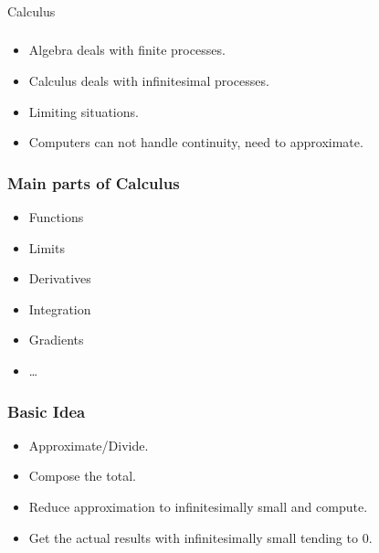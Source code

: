 \begin{frame}[fragile]\frametitle{}
\begin{center}
{\Large Calculus}
\end{center}
\end{frame}

 \begin{frame}[fragile]\frametitle{}
\begin{itemize}
\item Algebra deals with finite processes.
\item Calculus deals with infinitesimal processes.
\item Limiting situations.
\item Computers can not handle continuity, need to approximate.
\end{itemize}
\end{frame}



 \begin{frame}[fragile]\frametitle{Main parts of Calculus}
\begin{itemize}
\item Functions
\item Limits
\item Derivatives
\item Integration
\item Gradients
\item \ldots
\end{itemize}
\end{frame}

 \begin{frame}[fragile]\frametitle{Basic Idea}
\begin{itemize}
\item Approximate/Divide.
\item Compose the total.
\item Reduce approximation to infinitesimally small and compute.
\item Get the actual results with infinitesimally small tending to 0.
\end{itemize}
\end{frame}


